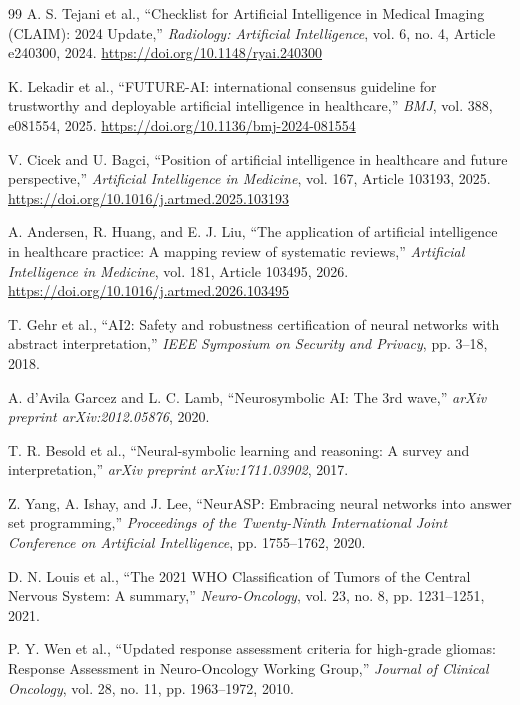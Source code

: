 \documentclass[preprint,11pt]{elsarticle}
\begin{document}
\begin{thebibliography}{99}
A. S. Tejani et al.,
``Checklist for Artificial Intelligence in Medical Imaging (CLAIM): 2024 Update,''
\emph{Radiology: Artificial Intelligence}, vol. 6, no. 4, Article e240300, 2024.
\url{https://doi.org/10.1148/ryai.240300}

K. Lekadir et al.,
``FUTURE-AI: international consensus guideline for trustworthy and deployable artificial intelligence in healthcare,''
\emph{BMJ}, vol. 388, e081554, 2025.
\url{https://doi.org/10.1136/bmj-2024-081554}

V. Cicek and U. Bagci,
``Position of artificial intelligence in healthcare and future perspective,''
\emph{Artificial Intelligence in Medicine}, vol. 167, Article 103193, 2025.
\url{https://doi.org/10.1016/j.artmed.2025.103193}

A. Andersen, R. Huang, and E. J. Liu,
``The application of artificial intelligence in healthcare practice: A mapping review of systematic reviews,''
\emph{Artificial Intelligence in Medicine}, vol. 181, Article 103495, 2026.
\url{https://doi.org/10.1016/j.artmed.2026.103495}

T. Gehr et al.,
``AI2: Safety and robustness certification of neural networks with abstract interpretation,''
\emph{IEEE Symposium on Security and Privacy}, pp. 3--18, 2018.

A. d'Avila Garcez and L. C. Lamb,
``Neurosymbolic AI: The 3rd wave,''
\emph{arXiv preprint arXiv:2012.05876}, 2020.

T. R. Besold et al.,
``Neural-symbolic learning and reasoning: A survey and interpretation,''
\emph{arXiv preprint arXiv:1711.03902}, 2017.

Z. Yang, A. Ishay, and J. Lee,
``NeurASP: Embracing neural networks into answer set programming,''
\emph{Proceedings of the Twenty-Ninth International Joint Conference on Artificial Intelligence}, pp. 1755--1762, 2020.

D. N. Louis et al.,
``The 2021 WHO Classification of Tumors of the Central Nervous System: A summary,''
\emph{Neuro-Oncology}, vol. 23, no. 8, pp. 1231--1251, 2021.

P. Y. Wen et al.,
``Updated response assessment criteria for high-grade gliomas: Response Assessment in Neuro-Oncology Working Group,''
\emph{Journal of Clinical Oncology}, vol. 28, no. 11, pp. 1963--1972, 2010.


\end{thebibliography}
\end{document}
